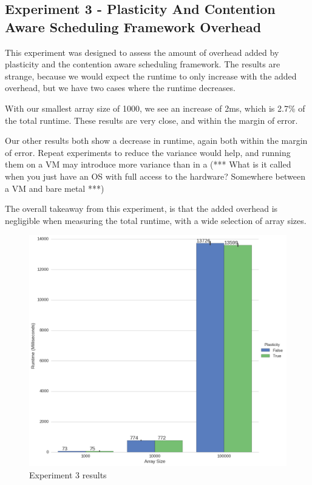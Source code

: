 



\subsection{Experiment 3 - Plasticity And Contention Aware Scheduling Framework Overhead}

This experiment was designed to assess the amount of overhead added by plasticity and the contention aware scheduling framework. The results are strange, because we would expect the runtime to only increase with the added overhead, but we have two cases where the runtime decreases. 

With our smallest array size of 1000, we see an increase of 2ms, which is 2.7\% of the total runtime. These results are very close, and within the margin of error. 

Our other results both show a decrease in runtime, again both within the margin of error. Repeat experiments to reduce the variance would help, and running them on a VM may introduce more variance than in a (*** What is it called when you just have an OS with full access to the hardware? Somewhere between a VM and bare metal ***)

The overall takeaway from this experiment, is that the added overhead is negligible when measuring the total runtime, with a wide selection of array sizes.



\begin{figure}[H]
	\centering
	\includegraphics[width=\textwidth]{graphics/experiment3.png}
	\caption{Experiment 3 results}
	\label{fig:results_ex3}
\end{figure}

